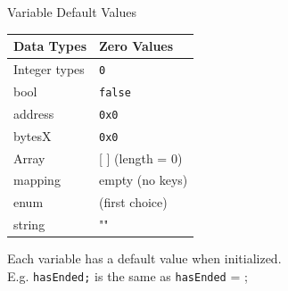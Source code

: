 \documentclass[handout]{beamer}
\begin{document}
\begin{frame}{Variable Default Values}

	\begin{table}
		\begin{tabular}{m{4cm} m{4cm}}
		\rowcolor{highlight}
			\hline
			Data Types & Zero Values\\
			\hline 
			\rowcolor{brightanthracite}
			Integer types & \texttt{0} \\
			bool &  \texttt{false} \\
			\rowcolor{brightanthracite}
			address & \texttt{0x0} \\
			bytesX & \texttt{0x0} \\
			\rowcolor{brightanthracite}
			Array & [ ] (length = 0) \\
			mapping & empty (no keys) \\
			\rowcolor{brightanthracite}
			enum & (first choice) \\
			string & "" \\
			\hline
		\end{tabular}
	\end{table}	
\vspace{1em}
Each variable has a default value when initialized. \\ E.g. \texttt{hasEnded;} is the same as \texttt{hasEnded} = ;	
	
\end{frame}
\end{document}
